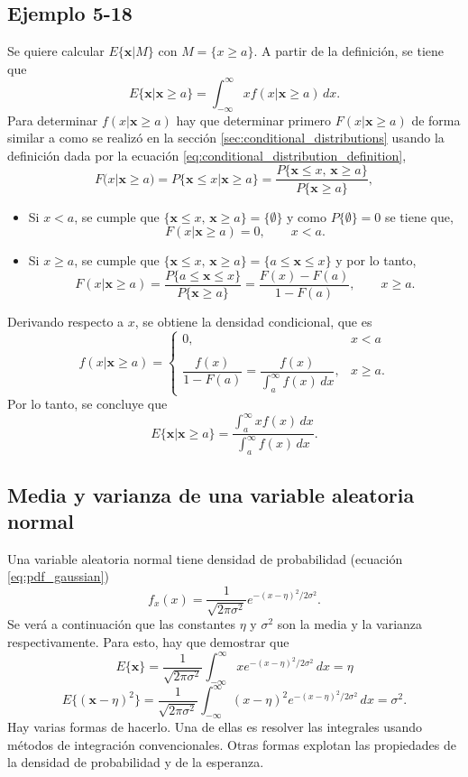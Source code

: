 \documentclass[a4paper]{report}
\newcommand{\x}{\mathbf{x}}
\begin{document}
\subsection{Ejemplo 5-18} Se quiere calcular \(E\{\x|M\}\) con \(M=\{x\geq a\}\). A partir de la definición, se tiene que
\[
 E\{\x|\x\geq a\}=\int_{-\infty}^{\infty}xf(x|\x\geq a)\,dx.
\]
Para determinar \(f(x|\x\geq a)\) hay que determinar primero \(F(x|\x\geq a)\) de forma similar a como se realizó en la sección \ref{sec:conditional_distributions} usando la definición dada por la ecuación \ref{eq:conditional_distribution_definition},
\[
 F(x|\x\geq a)=P\{\x\leq x|\x\geq a\}=\frac{P\{\x\leq x,\,\x\geq a\}}{P\{\x\geq a\}},
\]
\begin{itemize}
  \item Si \(x<a\), se cumple que \(\{\x\leq x,\,\x\geq a\}=\{\emptyset\}\) y como \(P\{\emptyset\}=0\) se tiene que,
 \[
  F(x|\x\geq a)=0,\qquad x<a.
 \]
 \item Si \(x\geq a\), se cumple que \(\{\x\leq x,\,\x\geq a\}=\{a\leq \x\leq x\}\) y por lo tanto,
 \[
  F(x|\x\geq a)=\frac{P\{a\leq \x\leq x\}}{P\{\x\geq a\}}=\frac{F(x)-F(a)}{1-F(a)},\qquad x\geq a.
 \]
\end{itemize}
Derivando respecto a \(x\), se obtiene la densidad condicional, que es
\[
   f(x|\x\geq a)=
 \left\{\begin{array}{ll}
  0, & x<a \\
  \\
  \dfrac{f(x)}{1-F(a)}=\dfrac{f(x)}{\int_{a}^{\infty}f(x)\,dx}, & x\geq a.
 \end{array} \right.
\]
Por lo tanto, se concluye que
\[
 E\{\x|\x\geq a\}=\frac{\int_{a}^{\infty}xf(x)\,dx}{\int_{a}^{\infty}f(x)\,dx}.
\]

\subsection{Media y varianza de una variable aleatoria normal}\label{sec:normal_mean_and_variance}

Una variable aleatoria normal tiene densidad de probabilidad (ecuación \ref{eq:pdf_gaussian})
\[
 f_x(x)=\frac{1}{\sqrt{2\pi\sigma^2}}e^{-(x-\eta)^2/2\sigma^2}.
\]
Se verá a continuación que las constantes \(\eta\) y \(\sigma^2\) son la media y la varianza respectivamente. Para esto, hay que demostrar que
\[
 E\{\x\}=\frac{1}{\sqrt{2\pi\sigma^2}}\int_{-\infty}^{\infty}xe^{-(x-\eta)^2/2\sigma^2}\,dx=\eta
\]
\[
 E\{(\x-\eta)^2\}=\frac{1}{\sqrt{2\pi\sigma^2}}\int_{-\infty}^{\infty}(x-\eta)^2e^{-(x-\eta)^2/2\sigma^2}\,dx=\sigma^2.
\]
Hay varias formas de hacerlo. Una de ellas es resolver las integrales usando métodos de integración convencionales. Otras formas explotan las propiedades de la densidad de probabilidad y de la esperanza. 
\end{document}
